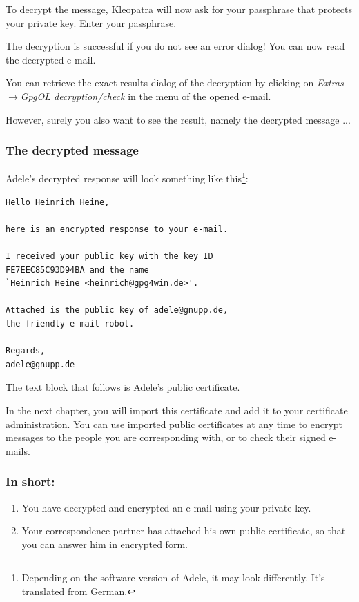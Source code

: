 \documentclass[a4paper,11pt,oneside,openright,titlepage]{scrbook}
\newcommand{\Menu}[1]{\textit{#1}}
\newcommand{\Email}{e-mail}
\begin{document}
To decrypt the message, Kleopatra
will now ask for your passphrase that protects your private key. Enter
your passphrase.

The decryption is successful if you do not see an
error dialog! You can now read the decrypted \Email{}.

You can retrieve the exact results dialog of the decryption by
clicking on \Menu{Extras$\rightarrow$GpgOL decryption/check} in the
menu of the opened \Email{}.

However, surely you also want to see the result, namely the decrypted
message ...

\clearpage
\subsubsection{The decrypted message}

Adele's decrypted response will look something like
this\footnote{Depending on the software version of Adele, it may look
differently. It's translated from German.}:


\begin{verbatim}
Hello Heinrich Heine,

here is an encrypted response to your e-mail.

I received your public key with the key ID
FE7EEC85C93D94BA and the name
`Heinrich Heine <heinrich@gpg4win.de>'.

Attached is the public key of adele@gnupp.de,
the friendly e-mail robot.

Regards,
adele@gnupp.de
\end{verbatim}

The text block that follows is Adele's public certificate.

In the next chapter, you will import this certificate and add it to
your certificate administration. You can use imported public
certificates at any time to encrypt messages to the people you are
corresponding with, or to check their signed \Email{}s.

\clearpage
\subsubsection{In short:}

\begin{enumerate}
    \item You have decrypted and encrypted an \Email{} using your
        private key.
    \item Your correspondence partner has attached his own public
        certificate, so that you can answer him in encrypted form.
\end{enumerate}
\end{document}
